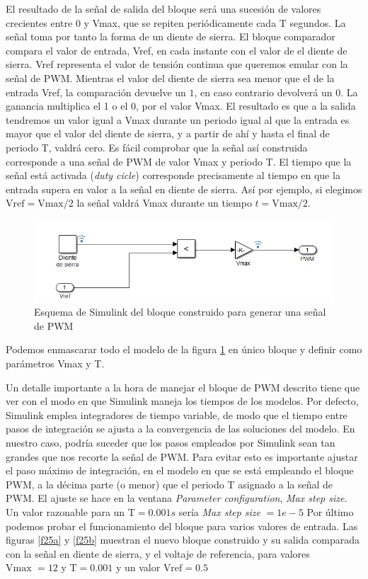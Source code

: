 \documentclass[10pt,a4paper]{report}
\begin{document}
El resultado de la señal de salida del bloque será una sucesión de valores crecientes entre $0$ y Vmax, que se repiten periódicamente cada T segundos. La señal toma por tanto la forma de un diente de sierra. El bloque comparador compara el valor de entrada, Vref,  en cada instante con el valor de el diente de sierra. Vref representa el valor de tensión continua que queremos emular con la señal de PWM. Mientras el valor del diente de sierra sea menor que el de la entrada Vref, la comparación devuelve un $1$, en caso contrario devolverá un $0$. La ganancia multiplica el 1 o el 0, por el valor Vmax. El resultado es que a la salida tendremos un valor igual a Vmax durante un periodo igual al que la entrada es mayor que el valor del diente de sierra, y a partir de ahí y hasta el final de periodo T, valdrá cero. Es fácil comprobar que la señal así construida corresponde a una señal de PWM de valor Vmax y periodo T. El tiempo que la señal está activada (\emph{duty cicle}) corresponde precisamente al tiempo en que la entrada supera en valor a la señal en diente de sierra. Así por ejemplo, si elegimos $\text{Vref} = \text{Vmax}/2$ la señal valdrá Vmax durante un tiempo $t=\text{Vmax}/2$.  
\begin{figure}
\centering
\includegraphics[scale=1]{pwm_gen.jpg}
\caption{Esquema de Simulink del bloque construido para generar una señal de PWM}
\label{f24}
\end{figure}
Podemos enmascarar todo el modelo de la figura \ref{f24} en único bloque y definir como parámetros Vmax y T. 

Un detalle importante a la hora de manejar el bloque de PWM descrito tiene que ver con el modo en que Simulink maneja los tiempos de los modelos. Por defecto, Simulink emplea integradores de tiempo variable, de modo que el tiempo entre pasos de integración se ajusta a la convergencia de las soluciones del modelo. En nuestro caso, podría suceder que los pasos empleados por Simulink sean tan grandes que nos recorte la señal de PWM. Para evitar esto es importante ajustar el paso máximo de integración, en el modelo en que se está empleando el bloque PWM, a la décima parte (o menor) que el periodo T asignado a la señal de PWM. El ajuste se hace en la ventana \emph{Parameter configuration}, \emph{Max step size}. Un valor razonable para un $\text{T} = 0.001s$ sería \emph{Max step size} $=1e-5$  
Por último podemos probar el funcionamiento del bloque para varios valores de entrada. Las figuras \ref{f25a} y \ref{f25b} muestran el nuevo bloque construido y su salida  comparada con la señal en diente de sierra, y el voltaje de referencia, para valores $\text{Vmax }= 12$ y $\text{T} = 0.001$ y un valor $\text{Vref} =0.5$ 
\end{document}
